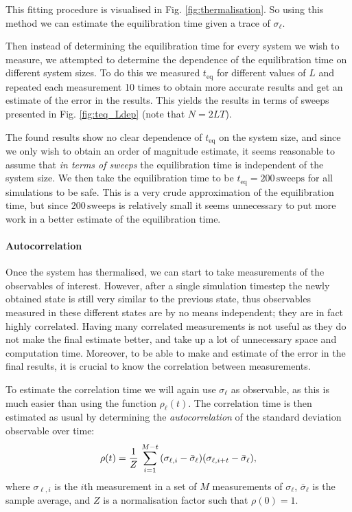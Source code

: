 This fitting procedure is visualised in Fig. \ref{fig:thermalisation}.
So using this method we can estimate the equilibration time given a trace of $\sigma_\ell$.

Then instead of determining the equilibration time for every system we wish to measure, we attempted to determine the dependence of the equilibration time on different system sizes.
To do this we measured $t_\text{eq}$ for different values of $L$ and repeated each measurement 10 times to obtain more accurate results and get an estimate of the error in the results.
This yields the results in terms of sweeps presented in Fig. \ref{fig:teq_Ldep} (note that $N = 2 L T$).

The found results show no clear dependence of $t_\text{eq}$ on the system size, and since we only wish to obtain an order of magnitude estimate, it seems reasonable to assume that \emph{in terms of sweeps} the equilibration time is independent of the system size.
We then take the equilibration time to be $t_\text{eq} = 200 \, \text{sweeps}$ for all simulations to be safe.
This is a very crude approximation of the equilibration time, but since $200 \, \text{sweeps}$ is relatively small it seems unnecessary to put more work in a better estimate of the equilibration time.


\paragraph{Autocorrelation}
Once the system has thermalised, we can start to take measurements of the observables of interest.
However, after a single simulation timestep the newly obtained state is still very similar to the previous state, thus observables measured in these different states are by no means independent; they are in fact highly correlated.
Having many correlated measurements is not useful as they do not make the final estimate better, and take up a lot of unnecessary space and computation time.
Moreover, to be able to make and estimate of the error in the final results, it is crucial to know the correlation between measurements.

To estimate the correlation time we will again use $\sigma_\ell$ as observable, as this is much easier than using the function $\rho_\ell(t)$.
The correlation time is then estimated as usual by determining the \emph{autocorrelation} of the standard deviation observable over time:
\begin{equation*}
    \rho(t) = \frac{1}{Z} \, \sum_{i = 1}^{M - t} \qty(\sigma_{\ell, i} - \bar{\sigma}_\ell) \qty(\sigma_{\ell, i + t} - \bar{\sigma}_\ell),
\end{equation*}
where $\sigma_{\ell, i}$ is the $i$th measurement in a set of $M$ measurements of $\sigma_\ell$, $\bar \sigma_\ell$ is the sample average, and $Z$ is a normalisation factor such that $\rho(0) = 1$.

